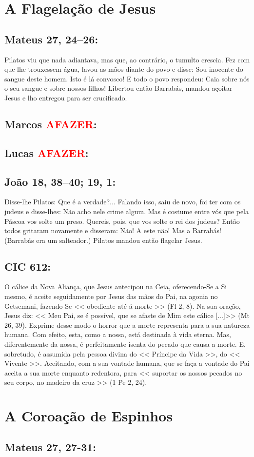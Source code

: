 \documentclass[10pt,a5paper]{book}
\newcommand{\from}[1]{\subsection*{#1}}
\newcommand{\TODO}{\textcolor{red}{\ttfamily AFAZER}}
\begin{document}
\section{A Flagelação de Jesus}

\from{Mateus 27, 24--26:}

Pilatos viu que nada adiantava, mas que, ao contrário, o tumulto crescia. Fez com que lhe trouxessem água, lavou as mãos diante do povo e disse: Sou inocente do sangue deste homem. Isto é lá convosco!
E todo o povo respondeu: Caia sobre nós o seu sangue e sobre nossos filhos!
Libertou então Barrabás, mandou açoitar Jesus e lho entregou para ser crucificado.

\from{Marcos \TODO:}

\from{Lucas \TODO:}

\from{João 18, 38--40; 19, 1:}

Disse-lhe Pilatos: Que é a verdade?... Falando isso, saiu de novo, foi ter com os judeus e disse-lhes: Não acho nele crime algum.
Mas é costume entre vós que pela Páscoa vos solte um preso. Quereis, pois, que vos solte o rei dos judeus?
Então todos gritaram novamente e disseram: Não! A este não! Mas a Barrabás! (Barrabás era um salteador.)
Pilatos mandou então flagelar Jesus.

\from{CIC 612:}

O cálice da Nova Aliança, que Jesus antecipou na Ceia, oferecendo-Se a Si mesmo, é aceite seguidamente por Jesus das mãos do Pai, na agonia no Getsemani, fazendo-Se << obediente até á morte >> (Fl 2, 8).
Na sua oração, Jesus diz: << Meu Pai, se é possível, que se afaste de Mim este cálice [...]>> (Mt 26, 39).
Exprime desse modo o horror que a morte representa para a sua natureza humana.
Com efeito, esta, como a nossa, está destinada à vida eterna.
Mas, diferentemente da nossa, é perfeitamente isenta do pecado que causa a morte.
E, sobretudo, é assumida pela pessoa divina do << Príncipe da Vida >>, do << Vivente >>.
Aceitando, com a sua vontade humana, que se faça a vontade do Pai aceita a sua morte enquanto redentora, para << suportar os nossos pecados no seu corpo, no madeiro da cruz >> (1 Pe 2, 24).


\section{A Coroação de Espinhos}

\from{Mateus 27, 27-31:}
\end{document}
